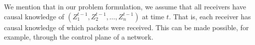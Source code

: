 %		
%		 	
%	


%
We mention that in our problem formulation, we assume that all receivers have causal knowledge of $(Z_{1}^{t-1}, Z_{2}^{t-1}, \ldots, Z_{n}^{t-1})$ at time $t$.  That is, each receiver has causal knowledge of which packets were received.  This can be made possible, for example, through the control plane of a network.


